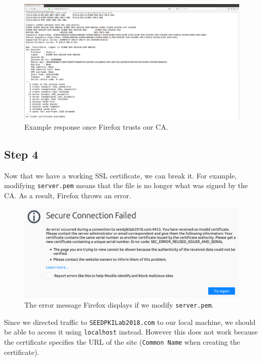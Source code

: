 \documentclass[12pt,letterpaper]{article}
\begin{document}
			\begin{figure}[h!]
				\includegraphics[width=\linewidth]{task-3-3-response}
				\caption{Example response once Firefox trusts our CA.}
			\end{figure}
		
		\pagebreak
		
		\subsection*{Step 4}
			Now that we have a working SSL certificate, we can break it. For example, modifying \texttt{server.pem} means that the file is no longer what was signed by the CA. As a result, Firefox throws an error.
			
			\begin{figure}[h!]
				\includegraphics[width=\linewidth]{task-3-4-modified}
				\caption{The error message Firefox displays if we modify \texttt{server.pem}.}
			\end{figure}
		
			Since we directed traffic to \texttt{SEEDPKILab2018.com} to our local machine, we should be able to access it using \texttt{localhost} instead. However this does not work because the certificate specifies the URL of the site (\texttt{Common Name} when creating the certificate).
			
\end{document}
